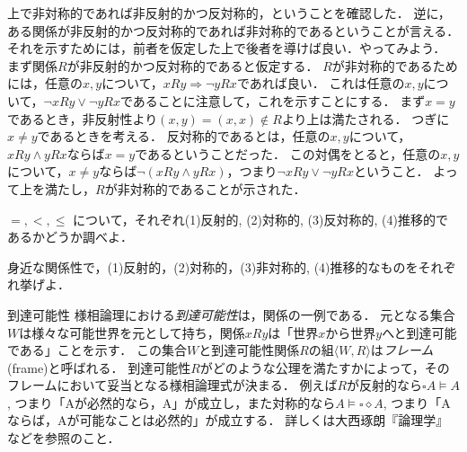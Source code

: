 \documentclass[11pt,a4paper]{bxjsarticle}
\begin{document}
上で非対称的であれば非反射的かつ反対称的，ということを確認した．
逆に，ある関係が非反射的かつ反対称的であれば非対称的であるということが言える．
それを示すためには，前者を仮定した上で後者を導けば良い．やってみよう．
まず関係$R$が非反射的かつ反対称的であると仮定する．
$R$が非対称的であるためには，任意の$x,y$について，$xRy \Rightarrow \neg yRx$であれば良い．
これは任意の$x,y$について，$\neg xRy \vee \neg yRx$であることに注意して，これを示すことにする．
まず$x=y$であるとき，非反射性より$(x,y) = (x,x) \not\in R$より上は満たされる．
つぎに$x\neq y$であるときを考える．
反対称的であるとは，任意の$x,y$について，$xRy \wedge yRx$ならば$x=y$であるということだった．
この対偶をとると，任意の$x,y$について，$x\neq y$ならば$\neg (xRy \wedge yRx)$，つまり$\neg xRy \vee \neg yRx$ということ．
よって上を満たし，$R$が非対称的であることが示された．



\begin{renshu}{}{}
 $=, <, \leq$ について，それぞれ(1)反射的, (2)対称的, (3)反対称的, (4)推移的であるかどうか調べよ．
\end{renshu}


\begin{renshu}{}{}
身近な関係性で，(1)反射的，(2)対称的，(3)非対称的, (4)推移的なものをそれぞれ挙げよ．
\end{renshu}



\begin{rei}{到達可能性}{}
様相論理における\emph{到達可能性}は，関係の一例である．
元となる集合$W$は様々な可能世界を元として持ち，関係$xRy$は「世界$x$から世界$y$へと到達可能である」ことを示す．
この集合$W$と到達可能性関係$R$の組$\langle W, R \rangle$は\emph{フレーム}(frame)と呼ばれる．
到達可能性$R$がどのような公理を満たすかによって，そのフレームにおいて妥当となる様相論理式が決まる．
例えば$R$が反射的なら$\square A \models A$, つまり「Aが必然的なら，A」が成立し，また対称的なら$A \models \square \diamond A$, つまり「Aならば，Aが可能なことは必然的」が成立する．
詳しくは大西琢朗『論理学』などを参照のこと．
\end{rei}
\end{document}
